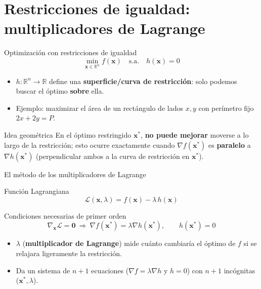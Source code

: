 \documentclass[aspectratio=169,10pt]{beamer}
\newcommand{\R}{\mathbb{R}}
\newcommand{\grad}{\nabla}
\newcommand{\x}{\mathbf{x}}
\begin{document}
\section{Restricciones de igualdad: multiplicadores de Lagrange}

\begin{frame}{Optimización con restricciones de igualdad}
  \[
    \min_{\x\in\R^n} f(\x) \quad \text{s.a.} \quad h(\x) = 0
  \]
  \begin{itemize}
    \item $h:\R^n\to\R$ define una \textbf{superficie/curva de
      restricción}: solo podemos buscar el óptimo \textbf{sobre} ella.
    \item Ejemplo: maximizar el área de un rectángulo de lados $x,y$ con
      perímetro fijo $2x+2y=P$.
  \end{itemize}
  \begin{alertblock}{Idea geométrica}
    En el óptimo restringido $\x^*$, \textbf{no puede mejorar} moverse a lo
    largo de la restricción; esto ocurre exactamente cuando $\grad
    f(\x^*)$ es \textbf{paralelo} a $\grad h(\x^*)$ (perpendicular ambos a
    la curva de restricción en $\x^*$).
  \end{alertblock}
\end{frame}

\begin{frame}{El método de los multiplicadores de Lagrange}
  \begin{block}{Función Lagrangiana}
    \[
      \mathcal L(\x,\lambda) = f(\x) - \lambda\, h(\x)
    \]
  \end{block}
  \begin{block}{Condiciones necesarias de primer orden}
    \[
      \grad_\x \mathcal L = \mathbf 0 \ \Longrightarrow\ \grad f(\x^*) =
      \lambda \grad h(\x^*), \qquad h(\x^*) = 0
    \]
  \end{block}
  \begin{itemize}
    \item $\lambda$ (\textbf{multiplicador de Lagrange}) mide cuánto
      cambiaría el óptimo de $f$ si se relajara ligeramente la restricción.
    \item Da un sistema de $n+1$ ecuaciones ($\grad f=\lambda\grad h$ y
      $h=0$) con $n+1$ incógnitas ($\x^*,\lambda$).
  \end{itemize}
\end{frame}
\end{document}
